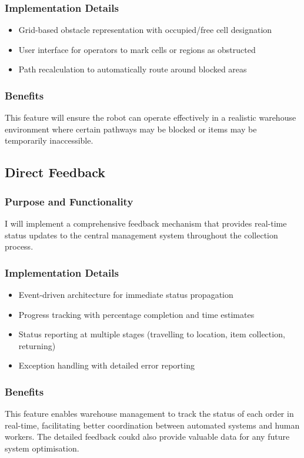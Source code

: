 \subsubsection{Implementation Details}
\begin{itemize}
    \item Grid-based obstacle representation with occupied/free cell designation
    \item User interface for operators to mark cells or regions as obstructed
    \item Path recalculation to automatically route around blocked areas

\end{itemize}

\subsubsection{Benefits}
This feature will ensure the robot can operate effectively in a realistic warehouse environment where certain pathways may be blocked or items may be temporarily inaccessible.

\subsection{Direct Feedback}

\subsubsection{Purpose and Functionality}
I will implement a comprehensive feedback mechanism that provides real-time status updates to the central management system throughout the collection process.

\subsubsection{Implementation Details}
\begin{itemize}
    \item Event-driven architecture for immediate status propagation
    \item Progress tracking with percentage completion and time estimates
    \item Status reporting at multiple stages (travelling to location, item collection, returning)
    \item Exception handling with detailed error reporting
\end{itemize}

\subsubsection{Benefits}
This feature enables warehouse management to track the status of each order in real-time, facilitating better coordination between automated systems and human workers. The detailed feedback coukd also provide valuable data for any future system optimisation.

